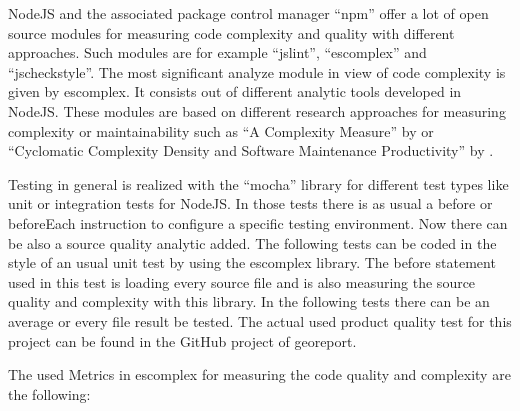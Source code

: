 \documentclass[DIV=calc,paper=a4,fontsize=9pt,twocolumn]{scrartcl}
\begin{document}
NodeJS and the associated package control manager \enquote{npm} offer a lot of open source modules for measuring code complexity and quality with different approaches. Such modules are for example \enquote{jslint}, \enquote{escomplex} and \enquote{jscheckstyle}. The most significant analyze module in view of code complexity is given by escomplex. It consists out of different analytic tools developed in NodeJS. These modules are based on different research approaches for measuring complexity or maintainability such as \enquote{A Complexity Measure} by \citet{mccabe1976complexity} or \enquote{Cyclomatic Complexity Density and Software Maintenance Productivity} by \citet{gill1991cyclomatic}.

Testing in general is realized with the \enquote{mocha} library for different test types like unit or integration tests for NodeJS. In those tests there is as usual a before or beforeEach instruction to configure a specific testing environment. Now there can be also a source quality analytic added. The following tests can be coded in the style of an usual unit test by using the escomplex library. The before statement used in this test is loading every source file and is also measuring the source quality and complexity with this library. In the following tests there can be an average or every file result be tested. The actual used product quality test for this project can be found in the GitHub project of georeport.


The used Metrics in escomplex for measuring the code quality and complexity are the following:
\end{document}
